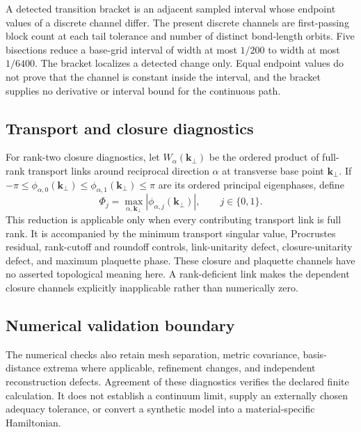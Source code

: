 A detected transition bracket is an adjacent sampled interval whose endpoint values of
a discrete channel differ. The present discrete channels are first-passing block count
at each tail tolerance and number of distinct bond-length orbits. Five bisections reduce
a base-grid interval of width at most $1/200$ to width at most $1/6400$. The bracket
localizes a detected change only. Equal endpoint values do not prove that the channel is
constant inside the interval, and the bracket supplies no derivative or interval bound
for the continuous path.

\subsection{Transport and closure diagnostics}

For rank-two closure diagnostics, let $W_\alpha(\mathbf k_\perp)$ be the ordered product
of full-rank transport links around reciprocal direction $\alpha$ at transverse base
point $\mathbf k_\perp$. If
$-\pi\le\phi_{\alpha,0}(\mathbf k_\perp)\le
\phi_{\alpha,1}(\mathbf k_\perp)\le\pi$ are its ordered principal eigenphases, define
\begin{equation}
 \Phi_j=\max_{\alpha,\mathbf k_\perp}
 |\phi_{\alpha,j}(\mathbf k_\perp)|,
 \qquad j\in\{0,1\}.
 \label{eq:multidimensional-closure-phase-reduction}
\end{equation}
This reduction is applicable only when every contributing transport link is full rank.
It is accompanied by the minimum transport singular value, Procrustes residual,
rank-cutoff and roundoff controls, link-unitarity defect, closure-unitarity defect, and
maximum plaquette phase. These closure and plaquette channels have no asserted
topological meaning here. A rank-deficient link makes the dependent closure channels
explicitly inapplicable rather than numerically zero.

\subsection{Numerical validation boundary}

The numerical checks also retain mesh separation, metric covariance, basis-distance
extrema where applicable, refinement changes, and independent reconstruction defects.
Agreement of these diagnostics verifies the declared finite calculation. It does not
establish a continuum limit, supply an externally chosen adequacy tolerance, or convert
a synthetic model into a material-specific Hamiltonian.
